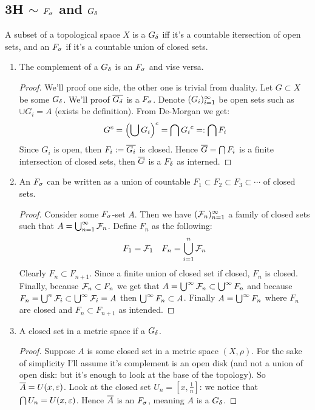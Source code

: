\documentclass[a4paper]{article}
\newcommand\nsubsection[1]{\subsection*{#1}\addcontentsline{toc}{subsection}{#1}}
\begin{document}
	\nsubsection{3H $\sim$ ${F_\sigma}$ and ${G_\delta}$}
	A subset of a topological space $X$ is a $G_\delta$ iff it's a countable itersection of open sets, and an $F_\sigma$ if it's a countable union of closed sets. 
	\begin{enumerate}
		\item The complement of a $G_\delta$ is an $F_\sigma$ and vise versa. 
		\begin{proof}
			We'll proof one side, the other one is trivial from duality. Let $G \subset X$ be some $G_\delta$. We'll proof $\overline{G_\delta}$ is a $F_\sigma$. Denote $(G_i)_{i = 1}^{\infty}$ be open sets such as $\cup G_i = A$ (exists be definition). From De-Morgan we get: 
			\[ {G}^c = \left ( \bigcup G_i \right )^c = \bigcap {G_i}^c =: \bigcap F_i \]
			Since $G_i$ is open, then $F_i := \overline{G_i}$ is closed. Hence $\overline{G} = \bigcap F_i$ is a finite intersection of closed sets, then $\overline{G}$ is a $F_\delta$ as interned. 
		\end{proof}
		\item An $F_\sigma$ can be written as a union of countable $F_1 \subset F_2 \subset F_3 \subset \cdots$ of closed sets. 
		\begin{proof}
			Consider some $F_\sigma$-set $A$. Then we have $(\mathcal{F}_n)_{n =1}^{\infty}$ a family of closed sets such that $A = \bigcup_{n = 1}^{\infty}\mathcal{F}_n$. Define $F_n$ as the following: 
			\begin{align*}
				F_1 = \mathcal{F}_1 && F_n = \bigcup_{i = 1}^{n}\mathcal{F}_n
			\end{align*}
			Clearly $F_n \subset F_{n + 1}$. Since a finite union of closed set if closed, $F_n$ is closed. Finally, because $\mathcal{F}_n \subset F_n$ we get that $A = \bigcup^{\infty} \mathcal{F}_n \subset \bigcup^{\infty} F_n$ and because $F_n = \bigcup^{n}\mathcal{F}_i \subset \bigcup^{\infty}\mathcal{F}_i = A$ then $\bigcup^{\infty}F_n \subset A$. Finally $A = \bigcup^{\infty}F_n$ where $F_n$ are closed and $F_{n} \subset F_{n + 1}$ as intended. 
		\end{proof}
		
		\item A closed set in a metric space if a $G_\delta$. \begin{proof}
			Suppose $A$ is some closed set in a metric space $(X, \rho)$. For the sake of simplicity I'll assume it's complement is an open disk (and not a union of open disk: but it's enough to look at the base of the topology). So $\ol A = U(x, \eg)$. Look at the closed set $U_n = [x, \frac{1}{n}]$: we notice that $\bigcap U_n = U(x, \eg)$. Hence $\overline A$ is an $F_\sigma$, meaning $A$ is a $G_\delta$. 
			

\end{proof}
\end{enumerate}
\end{document}
